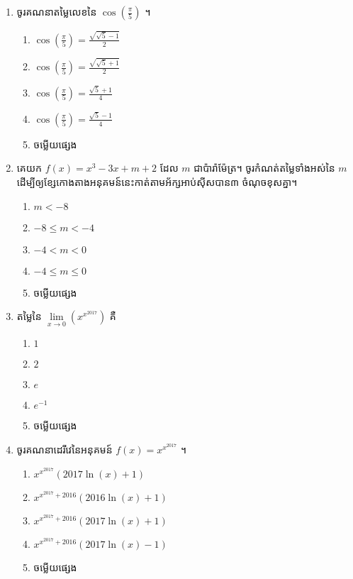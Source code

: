 \documentclass[12pt, a4paper]{article}
\begin{document}
\begin{enumerate}[m]
	\item ចូរគណនាតម្លៃលេខនៃ $\cos\left(\frac{\pi}{5}\right)$ ។
	\begin{enumerate}[k,2]
		\item $\cos\left(\frac{\pi}{5}\right)=\frac{\sqrt{\sqrt{5}-1}}{2}$
		\item $\cos\left(\frac{\pi}{5}\right)=\frac{\sqrt{\sqrt{5}+1}}{2}$
		\item $\cos\left(\frac{\pi}{5}\right)=\frac{\sqrt{5}+1}{4}$
		\item $\cos\left(\frac{\pi}{5}\right)=\frac{\sqrt{5}-1}{4}$
		\item ចម្លើយផ្សេង
	\end{enumerate}
	{\color{blue}\hrulefill}
	\item គេយក $f(x)=x^3-3x+m+2$ ដែល $m$ ជាប៉ារ៉ាម៉ែត្រ។ ចូរកំណត់តម្លៃទាំងអស់នៃ $m$ ដើម្បីឲ្យខ្សែកោងតាងអនុគមន៍នេះកាត់តាមអ័ក្សអាប់ស៊ីសបាន៣ ចំណុចខុសគ្នា។
	\begin{enumerate}[k,5]
		\item $m<-8$
		\item $-8\le m <-4$
		\item $-4<m<0$
		\item $-4\le m \le0$
		\item ចម្លើយផ្សេង
	\end{enumerate}
	{\color{blue}\hrulefill}
	\item តម្លៃនៃ $\lim\limits_{x\to0}\left(x^{x^{2017}}\right)$ គឺ
	\begin{enumerate}[k,5]
		\item $1$
		\item $2$
		\item $e$
		\item $e^{-1}$
		\item ចម្លើយផ្សេង
	\end{enumerate}
	{\color{blue}\hrulefill}
	\item ចូរគណនាដេរីវេនៃអនុគមន៍ $f(x)=x^{x^{2017}}$ ។
	\begin{enumerate}[k,3]
		\item $x^{x^{2017}}\left(2017\ln\left(x\right)+1\right)$
		\item $x^{x^{2017}+2016}\left(2016\ln\left(x\right)+1\right)$
		\item $x^{x^{2017}+2016}\left(2017\ln\left(x\right)+1\right)$
		\item $x^{x^{2017}+2016}\left(2017\ln\left(x\right)-1\right)$
		\item ចម្លើយផ្សេង
	\end{enumerate}

\end{enumerate}
\end{document}
